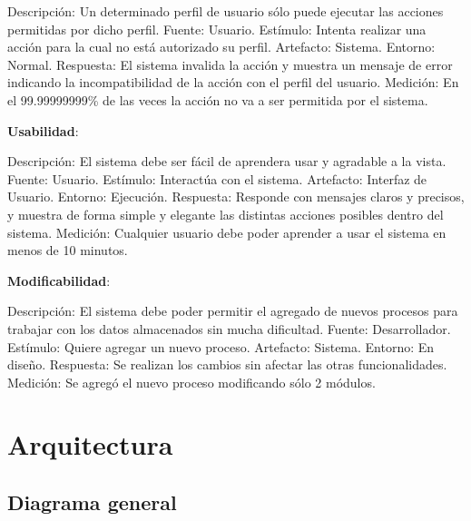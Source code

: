 \documentclass{article}
\theoremstyle{definition}
\theoremstyle{remark}
\begin{document}
Descripción: Un determinado perfil de usuario sólo puede ejecutar las acciones permitidas por dicho perfil.
Fuente: Usuario. %
Estímulo: Intenta realizar una acción para la cual no está autorizado su perfil.
Artefacto: Sistema.
Entorno: Normal.
Respuesta: El sistema invalida la acción y muestra un mensaje de error indicando la incompatibilidad de la acción con el perfil del usuario.
Medición: En el 99.99999999\% de las veces la acción no va a ser permitida por el sistema.

\textbf{Usabilidad}:

Descripción: El sistema debe ser fácil de aprendera usar y agradable a la vista.
Fuente: Usuario.
Estímulo: Interactúa con el sistema.
Artefacto: Interfaz de Usuario.
Entorno: Ejecución.
Respuesta: Responde con mensajes claros y precisos, y muestra de forma simple y elegante las distintas acciones posibles dentro del sistema.
Medición: Cualquier usuario debe poder aprender a usar el sistema en menos de 10 minutos.

\textbf{Modificabilidad}:

Descripción: El sistema debe poder permitir el agregado de nuevos procesos para trabajar con los datos almacenados sin mucha dificultad.
Fuente: Desarrollador.
Estímulo: Quiere agregar un nuevo proceso.
Artefacto: Sistema.
Entorno: En diseño.
Respuesta: Se realizan los cambios sin afectar las otras funcionalidades.
Medición: Se agregó el nuevo proceso modificando sólo 2 módulos.

\pagebreak

\section{Arquitectura}

\subsection{Diagrama general}
\end{document}
